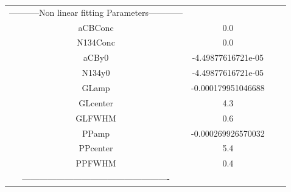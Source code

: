 \documentclass{article}
\begin{document}
\begin{tabular}{c c c c}

-----------Non linear fitting Parameters------------\\
aCBConc    &0.0\\
N134Conc   &0.0\\
aCBy0      &-4.49877616721e-05\\
N134y0     &-4.49877616721e-05\\
GLamp      &-0.000179951046688\\
GLcenter   &4.3\\
GLFWHM     &0.6\\
PPamp      &-0.000269926570032\\
PPcenter   &5.4\\
PPFWHM     &0.4\\
----------------------------------------------------\\


\end{tabular}
\end{document}
